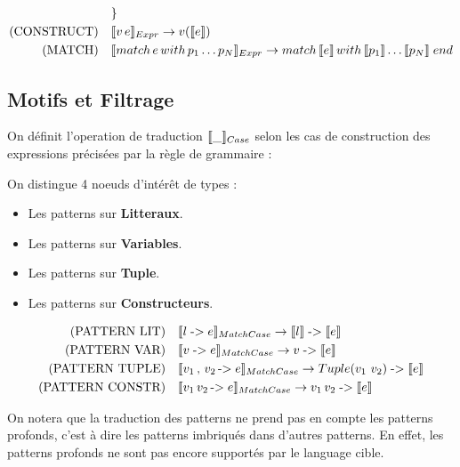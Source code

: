 \documentclass[
  12pt,
]{article}
\providecommand{\tightlist}{%
  \setlength{\itemsep}{0pt}\setlength{\parskip}{0pt}}
\begin{document}
\begin{align*}
                           & \}                                                                                                                                                                             \\
  \text{(CONSTRUCT)} \quad & \llbracket v \, e \rrbracket_{Expr} \rightarrow v(\llbracket e \rrbracket)                                                                                                                \\
  \text{(MATCH)} \quad     & \llbracket match \, e \, with \, p_1 \dots p_N  \rrbracket_{Expr}\rightarrow  match \, \llbracket e \rrbracket \, with \, \llbracket p_1 \rrbracket \dots \llbracket p_N \rrbracket \; end        \\
\end{align*}

\pagebreak
\subsection{Motifs et Filtrage}\label{motifs-et-filtrage}

On définit l'operation de traduction \(\llbracket \_ \rrbracket_{Case}\) selon les cas de construction
des expressions précisées par la règle de grammaire : 

On distingue 4 noeuds d'intérêt de types :
\begin{itemize}
  \tightlist
  \item
        Les patterns sur \textbf{Litteraux}.
  \item
        Les patterns sur \textbf{Variables}.
  \item
        Les patterns sur \textbf{Tuple}.
  \item
        Les patterns sur \textbf{Constructeurs}.
\end{itemize}

\begin{align*}
  \text{(PATTERN LIT)} \quad    & \llbracket l \; \text{->} \; e \rrbracket_{MatchCase} \rightarrow \llbracket l \rrbracket \; \text{->} \; \llbracket e \rrbracket                             \\
  \text{(PATTERN VAR)} \quad    & \llbracket v \; \text{->} \; e \rrbracket_{MatchCase} \rightarrow v \; \text{->} \; \llbracket e \rrbracket                             \\
  \text{(PATTERN TUPLE)} \quad  & \llbracket v_1 \, , \, v_2 \, \text{->} \; e \rrbracket_{MatchCase} \rightarrow Tuple(v_1 \, \, v_2) \; \text{->} \; \llbracket e \rrbracket            \\
  \text{(PATTERN CONSTR)} \quad & \llbracket v_1 \, v_2 \, \text{->} \; e \rrbracket_{MatchCase} \rightarrow v_1 \, v_2 \; \text{->} \; \llbracket e \rrbracket \\
\end{align*}

On notera que la traduction des patterns ne prend pas en compte les patterns profonds, c'est à dire les patterns imbriqués dans d'autres patterns.
En effet, les patterns profonds ne sont pas encore supportés par le language cible.
\end{document}
